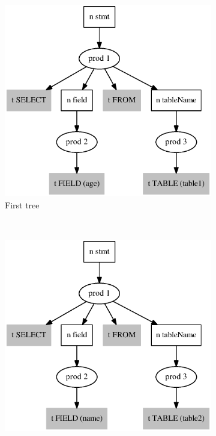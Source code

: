\documentclass{acm_proc_article-sp}
\begin{document}
\begin{figure}[h!]
  \begin{center}
    	\begin{subfigure}{0.2\textwidth}    
    		\includegraphics[scale=0.3]{graphs/SQL_sppf_static_tree1.eps}    
    		\caption{First tree}
    \label{tree_sql_11}
    \end{subfigure}
    ~
    \begin{subfigure}{0.2\textwidth}      
       \includegraphics[scale=0.3]{graphs/SQL_sppf_static_tree2.eps}
    

\end{subfigure}
\end{center}
\end{figure}
\end{document}
